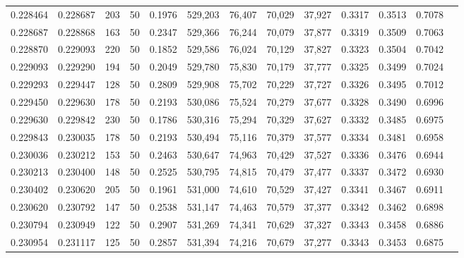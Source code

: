 \begin{tabular}{rrrrrrrrrrrrr}
0.228464 & 0.228687 &   203 &  50 &                                     0.1976 & 529,203 &  76,407 &  70,029 &  37,927 & 0.3317 & 0.3513 & 0.7078 \\
0.228687 & 0.228868 &   163 &  50 &                                     0.2347 & 529,366 &  76,244 &  70,079 &  37,877 & 0.3319 & 0.3509 & 0.7063 \\
0.228870 & 0.229093 &   220 &  50 &                                     0.1852 & 529,586 &  76,024 &  70,129 &  37,827 & 0.3323 & 0.3504 & 0.7042 \\
0.229093 & 0.229290 &   194 &  50 &                                     0.2049 & 529,780 &  75,830 &  70,179 &  37,777 & 0.3325 & 0.3499 & 0.7024 \\
0.229293 & 0.229447 &   128 &  50 &                                     0.2809 & 529,908 &  75,702 &  70,229 &  37,727 & 0.3326 & 0.3495 & 0.7012 \\
0.229450 & 0.229630 &   178 &  50 &                                     0.2193 & 530,086 &  75,524 &  70,279 &  37,677 & 0.3328 & 0.3490 & 0.6996 \\
0.229630 & 0.229842 &   230 &  50 &                                     0.1786 & 530,316 &  75,294 &  70,329 &  37,627 & 0.3332 & 0.3485 & 0.6975 \\
0.229843 & 0.230035 &   178 &  50 &                                     0.2193 & 530,494 &  75,116 &  70,379 &  37,577 & 0.3334 & 0.3481 & 0.6958 \\
0.230036 & 0.230212 &   153 &  50 &                                     0.2463 & 530,647 &  74,963 &  70,429 &  37,527 & 0.3336 & 0.3476 & 0.6944 \\
0.230213 & 0.230400 &   148 &  50 &                                     0.2525 & 530,795 &  74,815 &  70,479 &  37,477 & 0.3337 & 0.3472 & 0.6930 \\
0.230402 & 0.230620 &   205 &  50 &                                     0.1961 & 531,000 &  74,610 &  70,529 &  37,427 & 0.3341 & 0.3467 & 0.6911 \\
0.230620 & 0.230792 &   147 &  50 &                                     0.2538 & 531,147 &  74,463 &  70,579 &  37,377 & 0.3342 & 0.3462 & 0.6898 \\
0.230794 & 0.230949 &   122 &  50 &                                     0.2907 & 531,269 &  74,341 &  70,629 &  37,327 & 0.3343 & 0.3458 & 0.6886 \\
0.230954 & 0.231117 &   125 &  50 &                                     0.2857 & 531,394 &  74,216 &  70,679 &  37,277 & 0.3343 & 0.3453 & 0.6875 \\

\end{tabular}
